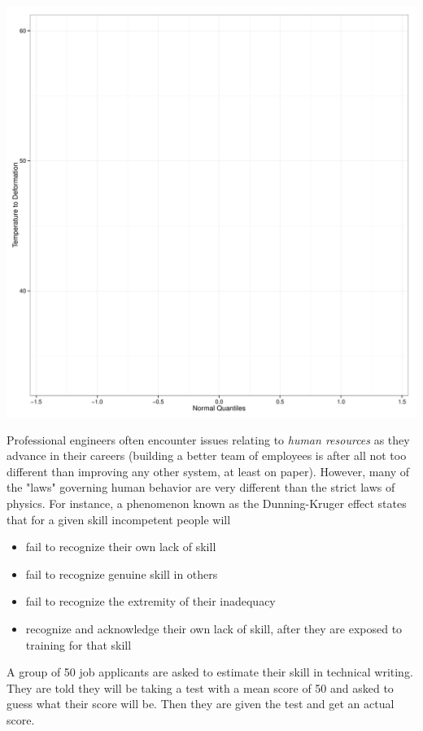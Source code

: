 \documentclass[addpoints]{examsetup}\usepackage[]{graphicx}\usepackage[]{color}
\newenvironment{knitrout}{}{} %
\begin{document}
\begin{questions}
\begin{parts}
\begin{knitrout}
\color{fgcolor}
\includegraphics[width=.8\linewidth]{figure/unnamed-chunk-6-1} 

\end{knitrout}

\end{parts}
\pagebreak

\question

Professional engineers often encounter issues relating to \textit{human resources} as they advance in their careers
(building a better team of employees is after all not too different than improving any other system, at least on paper).
However, many of the "laws" governing human behavior are very different than the strict laws of physics.
For instance, a phenomenon known as the Dunning-Kruger effect states that for a given skill incompetent people will
\begin{itemize}
   \item fail to recognize their own lack of skill
   \item fail to recognize genuine skill in others
   \item fail to recognize the extremity of their inadequacy
   \item recognize and acknowledge their own lack of skill, after they are exposed to training for that skill
\end{itemize}

A group of 50 job applicants are asked to estimate their skill in technical writing. 
They are told they will be taking a test with a mean score of 50 and asked to guess what their score will be.
Then they are given the test and get an actual score. 


\end{questions}
\end{document}
